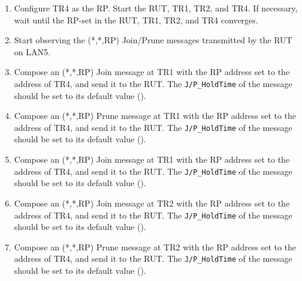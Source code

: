 \documentclass[11pt]{report}
\begin{document}


\begin{enumerate}

  \item Configure TR4 as the RP. Start the RUT, TR1, TR2, and TR4. If
  necessary, wait until the RP-set in the RUT, TR1, TR2, and TR4
  converges.

  \item Start observing the (*,*,RP) Join/Prune messages transmitted by the
  RUT on LAN5.

  \item Compose an (*,*,RP) Join message at TR1 with the RP address set to the
  address of TR4, and send it to the RUT. 
  The \verb=J/P_HoldTime= of the message should be set to its default
  value ({\PimsmJPHoldTime}).

  \item Compose an (*,*,RP) Prune message at TR1 with the RP address set to the
  address of TR4, and send it to the RUT. 
  The \verb=J/P_HoldTime= of the message should be set to its default
  value ({\PimsmJPHoldTime}).

  \item Compose an (*,*,RP) Join message at TR1 with the RP address set to the
  address of TR4, and send it to the RUT. 
  The \verb=J/P_HoldTime= of the message should be set to its default
  value ({\PimsmJPHoldTime}).

  \item Compose an (*,*,RP) Join message at TR2 with the RP address set to the
  address of TR4, and send it to the RUT. 
  The \verb=J/P_HoldTime= of the message should be set to its default
  value ({\PimsmJPHoldTime}).

  \item Compose an (*,*,RP) Prune message at TR2 with the RP address set to the
  address of TR4, and send it to the RUT. 
  The \verb=J/P_HoldTime= of the message should be set to its default
  value ({\PimsmJPHoldTime}).

\end{enumerate}

\end{document}
